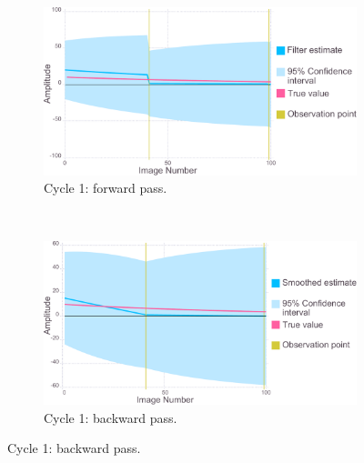 \begin{figure}
    \begin{subfigure}[b]{1.0\textwidth}
        \centering
        \includegraphics[width=\textwidth]{figures/datared/intDecSim_Filt1_bad.pdf}
        \caption{Cycle 1: forward pass.}
        \label{fig:UKF simulation results - cycle 1 - bad}
    \end{subfigure}
    \\
    \begin{subfigure}[b]{1.0\textwidth}
        \centering
        \includegraphics[width=\textwidth]{figures/datared/intDecSim1_bad.pdf}
        \caption{Cycle 1: backward pass.}
        \label{fig:URTSS simulation results - cycle 1 - bad}
    \end{subfigure}
\end{figure}
